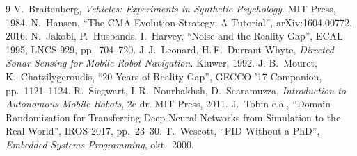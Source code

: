 \documentclass[10pt,a4paper]{article}
\begin{document}
\begin{thebibliography}{9}\footnotesize
\setlength{\itemsep}{0pt}
 V.~Braitenberg, \emph{Vehicles: Experiments in Synthetic Psychology}. MIT Press, 1984.
 N.~Hansen, ``The CMA Evolution Strategy: A Tutorial'', arXiv:1604.00772, 2016.
 N.~Jakobi, P.~Husbands, I.~Harvey, ``Noise and the Reality Gap'', ECAL 1995, LNCS 929, pp.~704--720.
 J.\,J.~Leonard, H.\,F.~Durrant-Whyte, \emph{Directed Sonar Sensing for Mobile Robot Navigation}. Kluwer, 1992.
 J.-B.~Mouret, K.~Chatzilygeroudis, ``20 Years of Reality Gap'', GECCO '17 Companion, pp.~1121--1124.
 R.~Siegwart, I.\,R.~Nourbakhsh, D.~Scaramuzza, \emph{Introduction to Autonomous Mobile Robots}, 2e dr. MIT Press, 2011.
 J.~Tobin e.a., ``Domain Randomization for Transferring Deep Neural Networks from Simulation to the Real World'', IROS 2017, pp.~23--30.
 T.~Wescott, ``PID Without a PhD'', \emph{Embedded Systems Programming}, okt.~2000.
\end{thebibliography}
\end{document}
